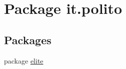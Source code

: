 \hypertarget{namespaceit_1_1polito}{}\section{Package it.\+polito}
\label{namespaceit_1_1polito}
\subsection*{Packages}
\begin{DoxyCompactItemize}
\item 
package \hyperlink{namespaceit_1_1polito_1_1elite}{elite}
\end{DoxyCompactItemize}
